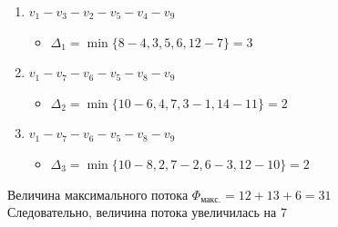 \documentclass[14pt]{extarticle}
\begin{document}
\par
\begin{enumerate} 
	\setlength{\itemindent}{3mm}
	\item $v_1 - v_3 - v_2 - v_5 - v_4 - v_9$
	\begin{itemize}
		\setlength{\itemindent}{3mm}
		\item $\Delta_1 = \min\{8-4, 3, 5, 6, 12-7\} = 3$
	\end{itemize}
	\item $v_1 - v_7 - v_6 - v_5 - v_8 - v_9$
	\begin{itemize}
		\setlength{\itemindent}{3mm}
		\item $\Delta_2 = \min\{10-6, 4, 7, 3 - 1, 14 - 11\} = 2$
        \end{itemize}
        \item $v_1 - v_7 - v_6 - v_5 - v_8 - v_9$
	\begin{itemize}
		\setlength{\itemindent}{3mm}
	    \item $\Delta_3 = \min\{10-8, 2, 7-2, 6-3, 12-10\} = 2$
	\end{itemize}
\end{enumerate}
\par
Величина максимального потока $\Phi_{\text{макс.}} = 12 + 13 + 6 = 31$	\\
Следовательно, величина потока увеличилась на 7
\end{document}
